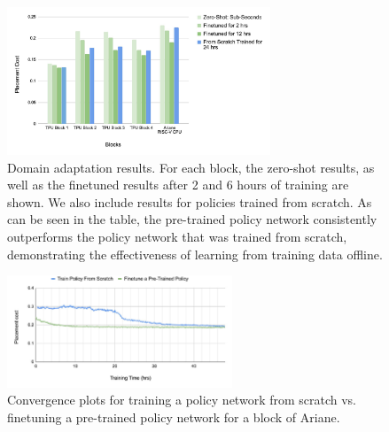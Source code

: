 \documentclass{article}
\begin{document}
\begin{figure}[t]
    \centering
    \includegraphics[width=0.7\textwidth]{GRL-charts.pdf}
    \caption{Domain adaptation results. For each block, the zero-shot results, as well as the finetuned results after 2 and 6 hours of training are shown. We also include results for policies trained from scratch. As can be seen in the table, the pre-trained policy network consistently outperforms the policy network that was trained from scratch, demonstrating the effectiveness of learning from training data offline.}
    \label{fig:generalizationresults}
\end{figure}
\begin{figure}[t]
    \centering
    \includegraphics[width=0.6\textwidth]{GRL-curve-c.pdf}
    \caption{Convergence plots for training a policy network from scratch vs. finetuning a pre-trained policy network for a block of Ariane.}
    \label{fig:convergenceresults}
\end{figure}
\end{document}
